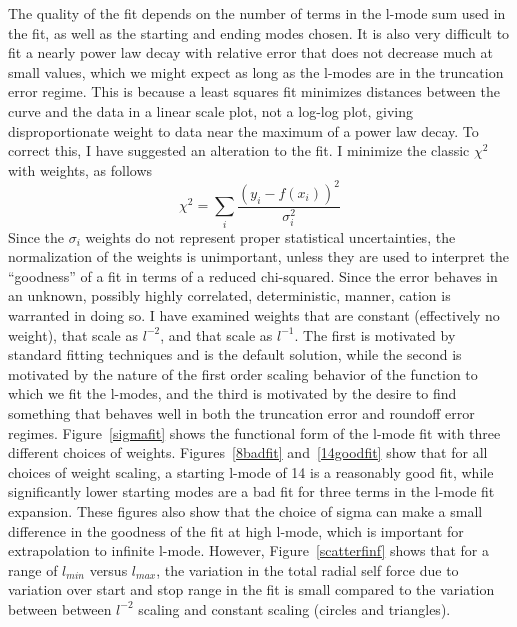 The quality of the fit depends on the number of terms in the l-mode sum used in the fit, as well as the starting and ending modes chosen. It is also very difficult to fit a nearly power law decay with relative error that does not decrease much at small values, which we might expect as long as the l-modes are in the truncation error regime. This is because a least squares fit minimizes distances between the curve and the data in a linear scale plot, not a log-log plot, giving disproportionate weight to data near the maximum of a power law decay. To correct this, I have suggested an alteration to the fit. I minimize the classic $\chi^2$ with weights, as follows
\begin{equation}
\chi^2=\sum_i \frac{(y_i-f(x_i))^2}{\sigma_i^2}
\end{equation}
Since the $\sigma_i$ weights do not represent proper statistical uncertainties, the normalization of the weights is unimportant, unless they are used to interpret the ``goodness'' of a fit in terms of a reduced chi-squared. Since the error behaves in an unknown, possibly highly correlated, deterministic, manner, cation is warranted in doing so. I have examined weights that are constant (effectively no weight), that  scale as $l^{-2}$, and that scale as $l^{-1}$. The first is motivated by standard fitting techniques and is the default solution, while the second is motivated by the nature of the first order scaling behavior of the function to which we fit the l-modes, and the third is motivated by the desire to find something that behaves well in both the truncation error and roundoff error regimes. Figure~\ref{sigmafit} shows the functional form of the l-mode fit with three different choices of weights. Figures~\ref{8badfit} and~\ref{14goodfit} show that for all choices of weight scaling, a starting l-mode of 14 is a reasonably good fit, while significantly lower starting modes are a bad fit for three terms in the l-mode fit expansion. These figures also show that the choice of sigma can make a small difference in the goodness of the fit at high l-mode, which is important for extrapolation to infinite l-mode. However, Figure~\ref{scatterfinf} shows that for a range of $l_{min}$ versus $l_{max}$, the variation in the total radial self force due to variation over start and stop range in the fit is small compared to the variation between between $l^{-2}$ scaling and constant scaling (circles and triangles). 

